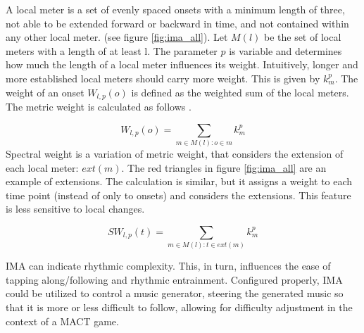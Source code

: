 A local meter is a set of evenly spaced onsets with a minimum length of three, not able to be extended forward or backward in time, and not contained within any other local meter. (see figure \ref{fig:ima_all}). Let $M(l)$ be the set of local meters with a length of at least l. The parameter $p$ is variable and determines how much the length of a local meter influences its weight. Intuitively, longer and more established local meters should carry more weight. This is given by $k_{m}^p$. The weight of an onset $W_{l,p}(o)$ is defined as the weighted sum of the local meters.  
The metric weight is calculated as follows \cite{Volk2008Syncopation}.  

\begin{equation}
 W_{l,p}(o) = \sum_{m \in M(l):o \in m}k_{m}^{p}
\end{equation} 
Spectral weight is a variation of metric weight, that considers the extension of each local meter: $ext(m)$. The red triangles in figure \ref{fig:ima_all} are an example of extensions. The calculation is similar, but it assigns a weight to each time point (instead of only to onsets) and considers the extensions. This feature is less sensitive to local changes.

\begin{equation}
 SW_{l,p}(t) = \sum_{m \in M(l):t \in ext(m)}k_{m}^{p}
\end{equation}

IMA can indicate rhythmic complexity. This, in turn, influences the ease of tapping along/following \cite{Volk2008Syncopation} and rhythmic entrainment. Configured properly, IMA could be utilized to control a music generator, steering the generated music so that it is more or less difficult to follow, allowing for difficulty adjustment in the context of a MACT game. 


